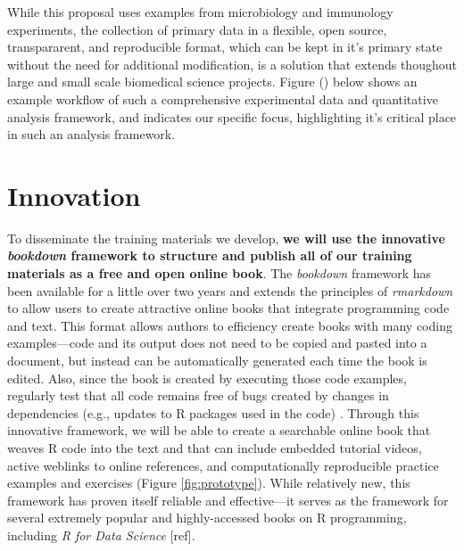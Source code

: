 \documentclass[pdftex,english,11pt,parskip=half]{scrartcl}
\begin{document}
While this proposal uses examples from microbiology and immunology experiments,
the collection of primary data in a flexible, open source, transpararent, 
and reproducible format, which can be kept in it's primary state without the 
need for additional modification, is a solution that extends thoughout
large and small scale biomedical science projects.  Figure () below shows an 
example workflow of such a comprehensive experimental data and quantitative 
analysis framework, and indicates our specific focus, highlighting it's 
critical place in such an analysis framework.

\section{Innovation} \vspace{-0.1in}

To disseminate the training materials we develop, \textbf{we will use the
innovative \textit{bookdown} framework \cite{xie2016bookdown} to structure and
publish all of our training materials as a free and open online book}. The
\textit{bookdown} framework has been available for a little over two years and
extends the principles of \textit{rmarkdown} to allow users to create attractive
online books that integrate programming code and text. This format allows
authors to efficiency create books with many coding examples---code and its
output does not need to be copied and pasted into a document, but instead can be
automatically generated each time the book is edited. Also, since the book is
created by executing those code examples, regularly test that all code remains
free of bugs created by changes in dependencies (e.g., updates to R packages
used in the code) \cite{xie2016bookdown}. Through this innovative framework, we
will be able to create a searchable online book that weaves R code into the text
and that can include embedded tutorial videos, active weblinks to online
references, and computationally reproducible practice examples and exercises
(Figure \ref{fig:prototype}). While relatively new, this framework has proven
itself reliable and effective---it serves as the framework for several extremely
popular and highly-accessed books on R programming, including \textit{R for Data
Science} [ref]. 
\end{document}
